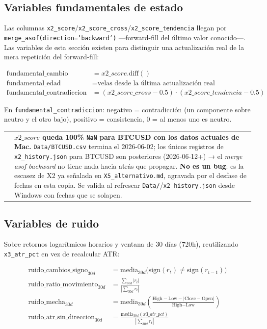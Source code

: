 \documentclass[11pt,a4paper]{article}
\makeatletter
\newcommand{\code}[1]{\texttt{\small #1}}
\newenvironment{advertencia}{%
  \par\medskip\noindent
  \begin{tabular}{@{}p{0.4em}@{\hspace{8pt}}p{\dimexpr\linewidth-2em\relax}@{}}
  \textcolor{crojo}{\rule{3pt}{1.1em}} &
}{\end{tabular}\par\medskip}
\makeatother
\begin{document}
\subsection{Variables fundamentales de estado}

Las columnas \code{x2\_score}/\code{x2\_score\_cross}/\code{x2\_score\_tendencia} llegan
por \code{merge\_asof(direction='backward')} —forward-fill del último valor conocido—.
Las variables de esta sección existen para distinguir una actualización real de la mera
repetición del forward-fill:

\begin{align}
\text{fundamental\_cambio} &= x2\_score.\mathrm{diff}() \\
\text{fundamental\_edad} &= \text{velas desde la última actualización real} \\
\text{fundamental\_contradiccion} &= (x2\_score\_cross - 0.5)\cdot
  (x2\_score\_tendencia - 0.5)
\end{align}

En \code{fundamental\_contradiccion}: negativo = contradicción (un componente sobre
neutro y el otro bajo), positivo = consistencia, \(0\) = al menos uno es neutro.

\begin{advertencia}
\textbf{\(x2\_score\) queda 100\% \texttt{NaN} para BTCUSD con los datos actuales de Mac.}
\code{Data/BTCUSD.csv} termina el 2026-06-02; los únicos registros de
\code{x2\_history.json} para BTCUSD son posteriores (2026-06-12+) → el \emph{merge asof
backward} no tiene nada hacia atrás que propagar. \textbf{No es un bug}: es la escasez de
X2 ya señalada en \code{X5\_alternativo.md}, agravada por el desfase de fechas en esta
copia. Se valida al refrescar \code{Data/}/\code{x2\_history.json} desde Windows con fechas
que se solapen.
\end{advertencia}

\subsection{Variables de ruido}

Sobre retornos logarítmicos horarios y ventana de 30 días (720h), reutilizando
\code{x3\_atr\_pct} en vez de recalcular ATR:

\begin{align}
\text{ruido\_cambios\_signo}_{30d} &= \mathrm{media}_{30d}\big(\mathrm{sign}(r_t) \neq
  \mathrm{sign}(r_{t-1})\big) \\
\text{ruido\_ratio\_movimiento}_{30d} &= \frac{\sum_{30d} |r_t|}
  {\left|\sum_{30d} r_t\right|} \\
\text{ruido\_mecha}_{30d} &= \mathrm{media}_{30d}\left(
  \frac{\text{High}-\text{Low}-|\text{Close}-\text{Open}|}{\text{High}-\text{Low}}\right) \\
\text{ruido\_atr\_sin\_direccion}_{30d} &= \frac{\mathrm{media}_{30d}(x3\_atr\_pct)}
  {\left|\sum_{30d} r_t\right|}
\end{align}
\end{document}
